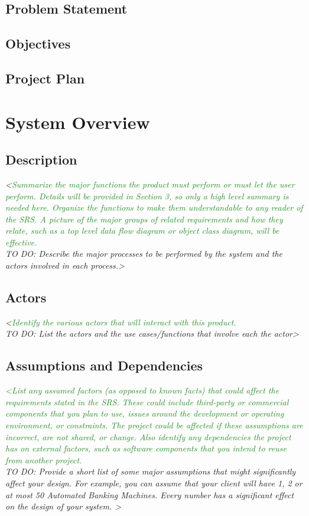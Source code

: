\documentclass[12pt,a4paper]{report}
\begin{document}
\section{Problem Statement}

\section{Objectives}
\section{Project Plan}

\chapter{System Overview}
\section{Description}
\textit{<\textcolor{ForestGreen}{Summarize the major functions the product must perform or must let the user perform. Details will
be provided in Section 3, so only a high level summary is needed here. Organize the functions to
make them understandable to any reader of the SRS. A picture of the major groups of related
requirements and how they relate, such as a top level data flow diagram or object class diagram, will
be effective.} \\
TO DO: Describe the major processes to be performed by the system and the actors involved in
each process.>}

\section{Actors}
\textit{<\textcolor{ForestGreen}{Identify the various actors that will interact with this product.} \\
TO DO: List the actors and the use cases/functions that involve each the actor>}

\section{Assumptions and Dependencies}
\textit{\textcolor{ForestGreen}{<List any assumed factors (as opposed to known facts) that could affect the requirements stated in
the SRS. These could include third-party or commercial components that you plan to use, issues
around the development or operating environment, or constraints. The project could be affected if
these assumptions are incorrect, are not shared, or change. Also identify any dependencies the
project has on external factors, such as software components that you intend to reuse from another
project.} \\
TO DO: Provide a short list of some major assumptions that might significantly affect your design.
For example, you can assume that your client will have 1, 2 or at most 50 Automated Banking
Machines. Every number has a significant effect on the design of your system. >}
\end{document}
